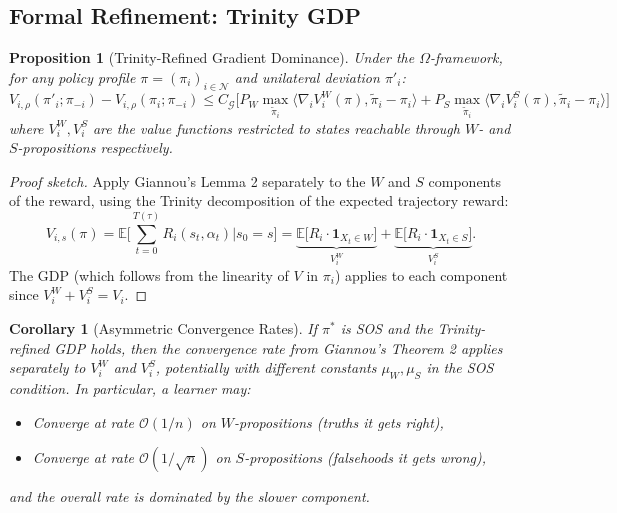 \documentclass[11pt,a4paper]{article}
\newtheorem{proposition}[theorem]{Proposition}
\newtheorem{corollary}[theorem]{Corollary}
\newcommand{\E}{\mathbb{E}}
\newcommand{\calO}{\mathcal{O}}
\begin{document}
\subsection{Formal Refinement: Trinity GDP}

\begin{proposition}[Trinity-Refined Gradient Dominance]
\label{prop:trinity-gdp}
Under the $\Omega$-framework, for any policy profile $\pi = (\pi_i)_{i \in \mathcal{N}}$ and unilateral deviation $\pi'_i$:
\begin{equation}
V_{i,\rho}(\pi'_i; \pi_{-i}) - V_{i,\rho}(\pi_i; \pi_{-i}) \leq C_\mathcal{G}\Big[P_W \max_{\tilde\pi_i}\langle \nabla_i V_i^W(\pi), \tilde\pi_i - \pi_i\rangle + P_S \max_{\tilde\pi_i}\langle \nabla_i V_i^S(\pi), \tilde\pi_i - \pi_i\rangle\Big]
\label{eq:trinity-gdp}
\end{equation}
where $V_i^W, V_i^S$ are the value functions restricted to states reachable through $W$- and $S$-propositions respectively.
\end{proposition}

\begin{proof}[Proof sketch]
Apply Giannou's Lemma 2 separately to the $W$ and $S$ components of the reward, using the Trinity decomposition of the expected trajectory reward:
\[
V_{i,s}(\pi) = \E\bigg[\sum_{t=0}^{T(\tau)} R_i(s_t, \alpha_t) \bigg| s_0 = s\bigg] = \underbrace{\E\big[R_i \cdot \mathbf{1}_{X_t \in W}\big]}_{V_i^W} + \underbrace{\E\big[R_i \cdot \mathbf{1}_{X_t \in S}\big]}_{V_i^S}.
\]
The GDP (which follows from the linearity of $V$ in $\pi_i$) applies to each component since $V_i^W + V_i^S = V_i$.
\end{proof}

\begin{corollary}[Asymmetric Convergence Rates]
If $\pi^*$ is SOS and the Trinity-refined GDP holds, then the convergence rate from Giannou's Theorem 2 applies separately to $V_i^W$ and $V_i^S$, potentially with different constants $\mu_W, \mu_S$ in the SOS condition. In particular, a learner may:
\begin{itemize}[nosep]
\item Converge at rate $\calO(1/n)$ on $W$-propositions (truths it gets right),
\item Converge at rate $\calO(1/\sqrt{n})$ on $S$-propositions (falsehoods it gets wrong),
\end{itemize}
and the overall rate is dominated by the slower component.
\end{corollary}
\end{document}
